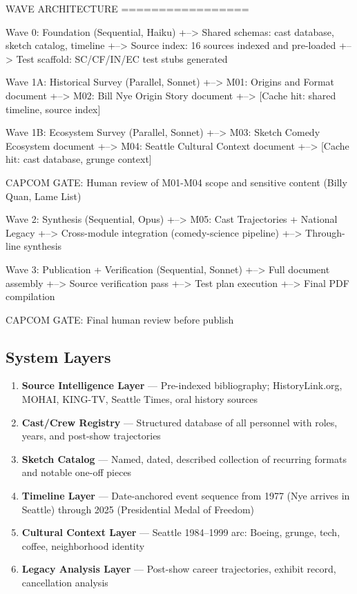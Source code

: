 \documentclass[11pt,letterpaper]{article}
\begin{document}
\begin{asciibox}
WAVE ARCHITECTURE
=================

  Wave 0: Foundation (Sequential, Haiku)
  +--> Shared schemas: cast database, sketch catalog, timeline
  +--> Source index: 16 sources indexed and pre-loaded
  +--> Test scaffold: SC/CF/IN/EC test stubs generated

  Wave 1A: Historical Survey (Parallel, Sonnet)
  +--> M01: Origins and Format document
  +--> M02: Bill Nye Origin Story document
  +--> [Cache hit: shared timeline, source index]

  Wave 1B: Ecosystem Survey (Parallel, Sonnet)
  +--> M03: Sketch Comedy Ecosystem document
  +--> M04: Seattle Cultural Context document
  +--> [Cache hit: cast database, grunge context]

  CAPCOM GATE: Human review of M01-M04 scope
  and sensitive content (Billy Quan, Lame List)

  Wave 2: Synthesis (Sequential, Opus)
  +--> M05: Cast Trajectories + National Legacy
  +--> Cross-module integration (comedy-science pipeline)
  +--> Through-line synthesis

  Wave 3: Publication + Verification (Sequential, Sonnet)
  +--> Full document assembly
  +--> Source verification pass
  +--> Test plan execution
  +--> Final PDF compilation

  CAPCOM GATE: Final human review before publish
\end{asciibox}

\subsection{System Layers}

\begin{enumerate}
  \item \textbf{Source Intelligence Layer} --- Pre-indexed bibliography; HistoryLink.org, MOHAI, KING-TV, Seattle Times, oral history sources
  \item \textbf{Cast/Crew Registry} --- Structured database of all personnel with roles, years, and post-show trajectories
  \item \textbf{Sketch Catalog} --- Named, dated, described collection of recurring formats and notable one-off pieces
  \item \textbf{Timeline Layer} --- Date-anchored event sequence from 1977 (Nye arrives in Seattle) through 2025 (Presidential Medal of Freedom)
  \item \textbf{Cultural Context Layer} --- Seattle 1984--1999 arc: Boeing, grunge, tech, coffee, neighborhood identity
  \item \textbf{Legacy Analysis Layer} --- Post-show career trajectories, exhibit record, cancellation analysis
\end{enumerate}
\end{document}
